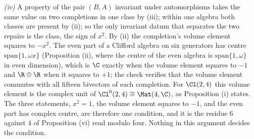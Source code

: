 \emph{(iv)} A property of the pair $(B, A)$ invariant under automorphisms takes the same value on two completions in one class by (iii); within one algebra both classes are present by (ii); so the only invariant datum that separates the two repairs is the class, the sign of $x^{2}$. By (ii) the completion's volume element squares to $-x^{2}$. The even part of a Clifford algebra on six generators has centre $\mathrm{span}\{1, \omega x\}$ (Proposition (ii), where the centre of the even algebra is $\mathrm{span}\{1, \omega\}$ in even dimension), which is $\C$ exactly when the volume element squares to $-1$ and $\R \oplus \R$ when it squares to $+1$; the check verifies that the volume element commutes with all fifteen bivectors of each completion. For $\Cl(2,4)$ this volume element is the complex unit of $\Cl^{0}(2,4) \cong \Mat(4,\C)$, as Proposition (i) states. The three statements, $x^{2} = 1$, the volume element squares to $-1$, and the even part has complex centre, are therefore one condition, and it is the residue $6$ against $4$ of Proposition (vi) read modulo four. Nothing in this argument decides the condition.
